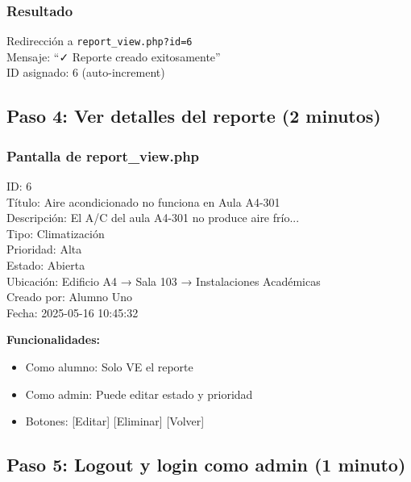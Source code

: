 \documentclass[12pt, a4paper, spanish]{article}
\begin{document}
\subsubsection{Resultado}

\begin{tcolorbox}[colback=verde!10, colframe=verde!50, title=Confirmación]
Redirección a \texttt{report\_view.php?id=6} \\
Mensaje: ``✓ Reporte creado exitosamente'' \\
ID asignado: 6 (auto-increment)
\end{tcolorbox}

\subsection{Paso 4: Ver detalles del reporte (2 minutos)}

\subsubsection{Pantalla de report\_view.php}

\begin{tcolorbox}[colback=codeBg, colframe=gris!50]
ID: 6 \\
Título: Aire acondicionado no funciona en Aula A4-301 \\
Descripción: El A/C del aula A4-301 no produce aire frío... \\
Tipo: Climatización \\
Prioridad: Alta \\
Estado: Abierta \\
Ubicación: Edificio A4 → Sala 103 → Instalaciones Académicas \\
Creado por: Alumno Uno \\
Fecha: 2025-05-16 10:45:32
\end{tcolorbox}

\textbf{Funcionalidades:}

\begin{itemize}
    \item Como alumno: Solo VE el reporte
    \item Como admin: Puede editar estado y prioridad
    \item Botones: [Editar] [Eliminar] [Volver]
\end{itemize}

\subsection{Paso 5: Logout y login como admin (1 minuto)}
\end{document}
